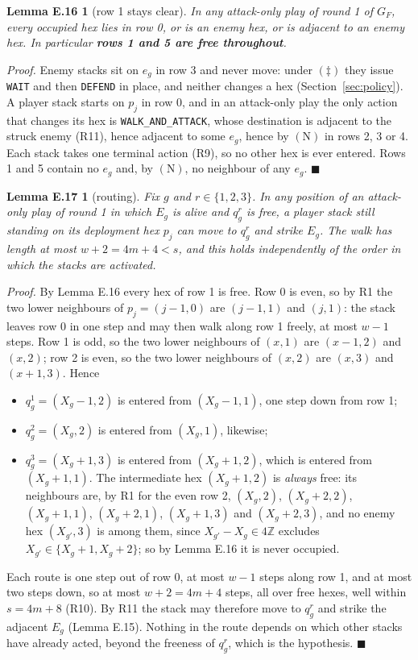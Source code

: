 \documentclass[11pt,a4paper]{article}
\theoremstyle{plain}
\newtheorem*{lemErow}{Lemma E.16}
\newtheorem*{lemEroute}{Lemma E.17}
\theoremstyle{definition}
\theoremstyle{plain}
\theoremstyle{definition}
\theoremstyle{remark}
\newcommand{\qedbox}{\hfill$\blacksquare$}
\begin{document}
\begin{lemErow}[row 1 stays clear]
In any attack-only play of round 1 of $G_F$, every occupied hex lies in row 0, or is an enemy
hex, or is adjacent to an enemy hex. In particular \textbf{rows 1 and 5 are free throughout}.
\end{lemErow}

\noindent\emph{Proof.} Enemy stacks sit on $e_g$ in row 3 and never move: under $(\ddagger)$
they issue \texttt{WAIT} and then \texttt{DEFEND} in place, and neither changes a hex
(Section~\ref{sec:policy}). A player stack starts on $p_j$ in row 0, and in an attack-only
play the only action that changes its hex is \texttt{WALK\_AND\_ATTACK}, whose destination is
adjacent to the struck enemy (R11), hence adjacent to some $e_g$, hence by $(\mathrm{N})$ in
rows 2, 3 or 4. Each stack takes one terminal action (R9), so no other hex is ever entered.
Rows 1 and 5 contain no $e_g$ and, by $(\mathrm{N})$, no neighbour of any $e_g$. \qedbox

\begin{lemEroute}[routing]
Fix $g$ and $r\in\{1,2,3\}$. In any position of an attack-only play of round 1 in which
$E_g$ is alive and $q_g^r$ is free, a player stack still standing on its deployment hex $p_j$ can move to
$q_g^r$ and strike $E_g$. The walk has length at most $w+2=4m+4<s$, and this holds
independently of the order in which the stacks are activated.
\end{lemEroute}

\noindent\emph{Proof.} By Lemma E.16 every hex of row 1 is free. Row 0 is even, so by R1 the
two lower neighbours of $p_j=(j-1,0)$ are $(j-1,1)$ and $(j,1)$: the stack leaves row 0 in one
step and may then walk along row 1 freely, at most $w-1$ steps. Row 1 is odd, so the two lower
neighbours of $(x,1)$ are $(x-1,2)$ and $(x,2)$; row 2 is even, so the two lower neighbours of
$(x,2)$ are $(x,3)$ and $(x+1,3)$. Hence
\begin{itemize}
\item $q_g^1=(X_g-1,2)$ is entered from $(X_g-1,1)$, one step down from row 1;
\item $q_g^2=(X_g,2)$ is entered from $(X_g,1)$, likewise;
\item $q_g^3=(X_g+1,3)$ is entered from $(X_g+1,2)$, which is entered from $(X_g+1,1)$. The
  intermediate hex $(X_g+1,2)$ is \emph{always} free: its neighbours are, by R1 for the even
  row 2, $(X_g,2)$, $(X_g+2,2)$, $(X_g+1,1)$, $(X_g+2,1)$, $(X_g+1,3)$ and $(X_g+2,3)$, and no
  enemy hex $(X_{g'},3)$ is among them, since $X_{g'}-X_g\in 4\mathbb{Z}$ excludes
  $X_{g'}\in\{X_g+1,X_g+2\}$; so by Lemma E.16 it is never occupied.
\end{itemize}
Each route is one step out of row 0, at most $w-1$ steps along row 1, and at most two steps
down, so at most $w+2=4m+4$ steps, all over free hexes, well within $s=4m+8$ (R10). By R11 the
stack may therefore move to $q_g^r$ and strike the adjacent $E_g$ (Lemma E.15). Nothing in the
route depends on which other stacks have already acted, beyond the freeness of $q_g^r$, which
is the hypothesis. \qedbox
\end{document}
